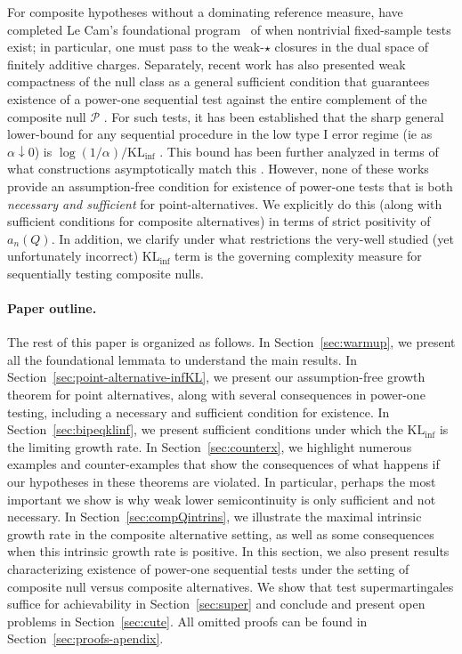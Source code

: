 \documentclass[11pt]{article}
\newcommand{\KLinf}{\mathrm{KL}_{\mathrm{inf}}}
\newcommand{\Pcal}{\mathcal{P}}
\theoremstyle{definition}
\theoremstyle{definition}
\begin{document}
For composite hypotheses without a dominating reference measure, \cite{larsson2026completecharacterizationtestablehypotheses}  have completed Le Cam's foundational program~\cite{lecam1986asymptotic} of when nontrivial fixed-sample tests exist; in particular, one must pass to the weak-$\star$ closures in the dual space of finitely additive charges. Separately, recent work has also presented weak compactness of the null class as a general sufficient condition that guarantees existence of a power-one sequential test against the entire complement of the composite null $\Pcal$ \parencite{ram2026powersequentialtestsexist}. For such tests, it has been established that the sharp general lower-bound for any sequential procedure in the low type I error regime (ie as $\alpha\downarrow 0$) is $\log(1/\alpha)/\KLinf$ \parencite{agrawal2025stoppingtimespoweronesequential}. This bound has been further analyzed in terms of what constructions asymptotically match this \parencite{shekhar2025optimalanytimevalidtestscomposite}. However, none of these works provide an assumption-free condition for existence of power-one tests that is both \textit{necessary and sufficient} for point-alternatives. We explicitly do this (along with sufficient conditions for composite alternatives) in terms of strict positivity of $a_n(Q)$. In addition, we clarify under what restrictions the very-well studied (yet unfortunately incorrect) $\KLinf$ term is the governing complexity measure for sequentially testing composite nulls. 

\paragraph{Paper outline.}
The rest of this paper is organized as follows. In Section~\ref{sec:warmup}, we present all the foundational lemmata to understand the main results. In Section~\ref{sec:point-alternative-infKL}, we present our assumption-free growth theorem for point alternatives, along with several consequences in power-one testing, including a necessary and sufficient condition for existence. In Section~\ref{sec:bipeqklinf}, we present sufficient conditions under which the $\KLinf$ is the limiting growth rate. In Section~\ref{sec:counterx}, we highlight numerous examples and counter-examples that show the consequences of what happens if our hypotheses in these theorems are violated. In particular, perhaps the most important we show is why weak lower semicontinuity is only sufficient and not necessary. In Section~\ref{sec:compQintrins}, we illustrate the maximal intrinsic growth rate in the composite alternative setting, as well as some consequences when this intrinsic growth rate is positive. In this section, we also present results characterizing existence of power-one sequential tests under the setting of composite null versus composite alternatives. We show that test supermartingales suffice for achievability in Section~\ref{sec:super} and conclude and present open problems in Section~\ref{sec:cute}. All omitted proofs can be found in Section~\ref{sec:proofs-apendix}.
\end{document}

